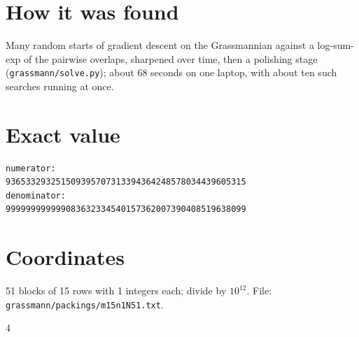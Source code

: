\documentclass[11pt,a4paper]{article}
\begin{document}
\section{How it was found}
Many random starts of gradient descent on the Grassmannian against a log-sum-exp of the pairwise overlaps, sharpened over time, then a polishing stage (\texttt{grassmann/solve.py}); about 68 seconds on one laptop, with about ten such searches running at once.


\appendix
\section{Exact value}
{\small
\begin{verbatim}
numerator:
936533293251509395707313394364248578034439605315
denominator:
999999999999083632334540157362007390408519638099
\end{verbatim}}

\section{Coordinates}
51 blocks of 15 rows with 1 integers each; divide by $10^{12}$. File: \texttt{grassmann/packings/m15n1N51.txt}.
{\tiny
\begin{multicols}{4}
\end{multicols}}
\end{document}
